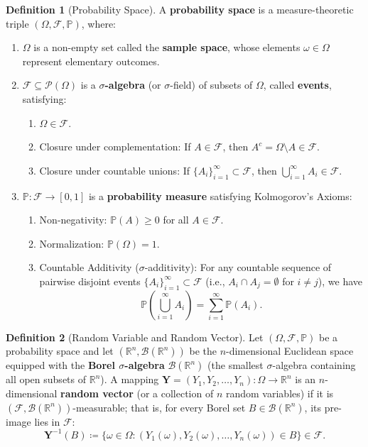 \documentclass[11pt, letterpaper]{article}
\theoremstyle{definition}
\newtheorem{definition}{Definition}[section]
\theoremstyle{remark}
\newcommand{\R}{\mathbb{R}}
\newcommand{\Prob}{\mathbb{P}}
\newcommand{\F}{\mathcal{F}}
\begin{document}
\begin{definition}[Probability Space]
A \textbf{probability space} is a measure-theoretic triple $(\Omega, \F, \Prob)$, where:
\begin{enumerate}[label=(\roman*)]
    \item $\Omega$ is a non-empty set called the \textbf{sample space}, whose elements $\omega \in \Omega$ represent elementary outcomes.
    \item $\F \subseteq \mathcal{P}(\Omega)$ is a \textbf{$\sigma$-algebra} (or $\sigma$-field) of subsets of $\Omega$, called \textbf{events}, satisfying:
    \begin{enumerate}[label=(\alph*)]
        \item $\Omega \in \F$.
        \item Closure under complementation: If $A \in \F$, then $A^c = \Omega \setminus A \in \F$.
        \item Closure under countable unions: If $\{A_i\}_{i=1}^\infty \subset \F$, then $\bigcup_{i=1}^\infty A_i \in \F$.
    \end{enumerate}
    \item $\Prob: \F \to [0, 1]$ is a \textbf{probability measure} satisfying Kolmogorov's Axioms:
    \begin{enumerate}[label=(\alph*)]
        \item Non-negativity: $\Prob(A) \ge 0$ for all $A \in \F$.
        \item Normalization: $\Prob(\Omega) = 1$.
        \item Countable Additivity ($\sigma$-additivity): For any countable sequence of pairwise disjoint events $\{A_i\}_{i=1}^\infty \subset \F$ (i.e., $A_i \cap A_j = \emptyset$ for $i \neq j$), we have
        \[
            \Prob\left(\bigcup_{i=1}^\infty A_i\right) = \sum_{i=1}^\infty \Prob(A_i).
        \]
    \end{enumerate}
\end{enumerate}
\end{definition}

\begin{definition}[Random Variable and Random Vector]
Let $(\Omega, \F, \Prob)$ be a probability space and let $(\R^n, \mathcal{B}(\R^n))$ be the $n$-dimensional Euclidean space equipped with the \textbf{Borel $\sigma$-algebra} $\mathcal{B}(\R^n)$ (the smallest $\sigma$-algebra containing all open subsets of $\R^n$). A mapping $\mathbf{Y} = (Y_1, Y_2, \dots, Y_n): \Omega \to \R^n$ is an $n$-dimensional \textbf{random vector} (or a collection of $n$ random variables) if it is $(\F, \mathcal{B}(\R^n))$-measurable; that is, for every Borel set $B \in \mathcal{B}(\R^n)$, its pre-image lies in $\F$:
\[
    \mathbf{Y}^{-1}(B) \coloneqq \{\omega \in \Omega : (Y_1(\omega), Y_2(\omega), \dots, Y_n(\omega)) \in B\} \in \F.
\]
\end{definition}
\end{document}
